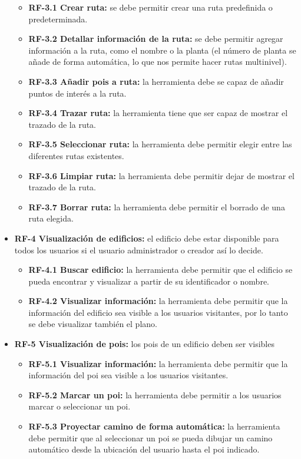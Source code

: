 \begin{itemize}
\begin{itemize}
	\item
	\textbf{RF-3.1 Crear ruta:} se debe permitir crear una ruta predefinida o predeterminada.
	\item
	\textbf{RF-3.2 Detallar información de la ruta:} se debe permitir agregar información a la ruta, como el nombre o la planta (el número de planta se añade de forma automática, lo que nos permite hacer rutas multinivel).
	\item
	\textbf{RF-3.3 Añadir pois a ruta:} la herramienta debe se capaz de añadir puntos de interés a la ruta.
	\item
	\textbf{RF-3.4 Trazar ruta:} la herramienta tiene que ser capaz de mostrar el trazado de la ruta.
	\item
	\textbf{RF-3.5 Seleccionar ruta:} la herramienta debe permitir elegir entre las diferentes rutas existentes.
	\item
	\textbf{RF-3.6 Limpiar ruta:} la herramienta debe permitir dejar de mostrar el trazado de la ruta.
	\item
	\textbf{RF-3.7 Borrar ruta:} la herramienta debe permitir el borrado de una ruta elegida.
\end{itemize}
\item
\textbf{RF-4 Visualización de edificios:} el edificio debe estar disponible para todos los usuarios si el usuario administrador o creador así lo decide.
\begin{itemize}
	\item
	\textbf{RF-4.1 Buscar edificio:} la herramienta debe permitir que el edificio se pueda encontrar y visualizar a partir de su identificador o nombre.
	\item
	\textbf{RF-4.2 Visualizar información:} la herramienta debe permitir que la información del edificio sea visible a los usuarios visitantes, por lo tanto se debe visualizar también el plano.
\end{itemize}
\item
\textbf{RF-5 Visualización de pois:} los pois de un edificio deben ser visibles
\begin{itemize}
	\item
	\textbf{RF-5.1 Visualizar información:} la herramienta debe permitir que la información del poi sea visible a los usuarios visitantes.
	\item
	\textbf{RF-5.2 Marcar un poi:} la herramienta debe permitir a los usuarios marcar o seleccionar un poi.
	\item
	\textbf{RF-5.3 Proyectar camino de forma automática:} la herramienta debe permitir que al seleccionar un poi se pueda dibujar un camino automático desde la ubicación del usuario hasta el poi indicado.

\end{itemize}
\end{itemize}
